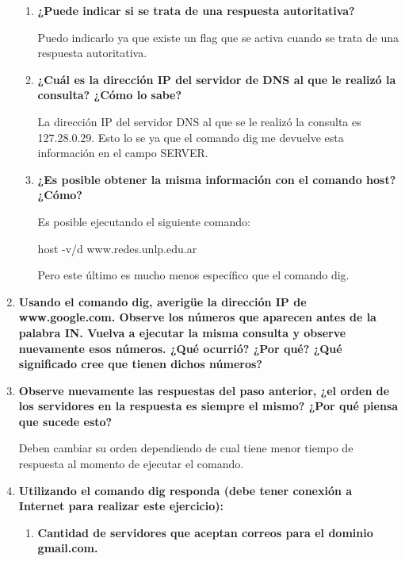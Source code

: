 \documentclass[a4paper,10pt]{article}
\begin{document}
\begin{enumerate}
\begin{enumerate}
                \item \textbf{¿Puede indicar si se trata de una respuesta autoritativa?}
                
                Puedo indicarlo ya que existe un flag que se activa cuando se trata de una respuesta autoritativa.
                
                \item \textbf{ ¿Cuál es la dirección IP del servidor de DNS al que le realizó la consulta? ¿Cómo lo sabe?}
                
                La dirección IP del servidor DNS al que se le realizó la consulta es 127.28.0.29. Esto lo se ya que el comando dig me devuelve esta información en el campo SERVER.
                
                \item \textbf{¿Es posible obtener la misma información con el comando host? ¿Cómo?}
                
                Es posible ejecutando el siguiente comando:
                
                \subitem host -v/d www.redes.unlp.edu.ar
            
                Pero este último es mucho menos específico que el comando dig.
            \end{enumerate}
            
        \item \textbf{Usando el comando dig, averigüe la dirección IP de www.google.com. Observe los números que aparecen antes de la palabra IN. Vuelva a ejecutar la misma consulta y observe nuevamente esos números. ¿Qué ocurrió? ¿Por qué? ¿Qué significado cree que tienen dichos números?}
        
        \item \textbf{Observe nuevamente las respuestas del paso anterior, ¿el orden de los servidores en la respuesta es siempre el mismo? ¿Por qué piensa que sucede esto?}
        
        Deben cambiar su orden dependiendo de cual tiene menor tiempo de respuesta al momento de ejecutar el comando.
        
        \item \textbf{Utilizando el comando dig responda (debe tener conexión a Internet para realizar este ejercicio):}
        
            \begin{enumerate}
                \item  \textbf{Cantidad de servidores que aceptan correos para el dominio gmail.com.}
                

\end{enumerate}
\end{enumerate}
\end{document}
